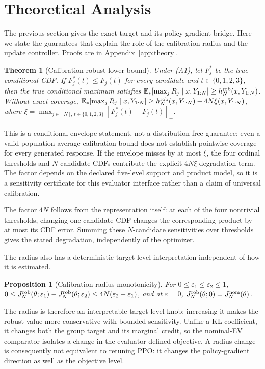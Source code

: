 \documentclass{article}
\newtheorem{proposition}{Proposition}
\newtheorem{theorem}{Theorem}
\theoremstyle{definition}
\theoremstyle{remark}
\begin{document}
\section{Theoretical Analysis}
\label{sec:theory}

The previous section gives the exact target and its policy-gradient bridge.
Here we state the guarantees that explain the role of the calibration radius
and the update controller.  Proofs are in Appendix~\ref{app:theory}.

\begin{theorem}[Calibration-robust lower bound]
\label{thm:coverage-summary}
Under (A1), let \(F_j^*\) be the true conditional CDF.  If
\(F_j^*(t)\le\overline F_j(t)\) for every candidate and
\(t\in\{0,1,2,3\}\), then
the true conditional maximum satisfies
\(\mathbb E_*[\max_jR_j\mid x,Y_{1:N}]\ge h_N^{\rm rob}(x,Y_{1:N})\).
Without exact coverage,
\(\mathbb E_*[\max_jR_j\mid x,Y_{1:N}]
\ge h_N^{\rm rob}(x,Y_{1:N})-4N\xi(x,Y_{1:N})\), where
\(\xi=\max_{j\in[N],\,t\in\{0,1,2,3\}}
[F_j^*(t)-\overline F_j(t)]_+\).
\end{theorem}

This is a conditional envelope statement, not a distribution-free guarantee:
even a valid population-average calibration bound does not establish
pointwise coverage for every generated response.  If the envelope misses by at most
\(\xi\), the four ordinal thresholds and \(N\) candidate CDFs contribute the
explicit \(4N\xi\) degradation term.  The factor depends on the declared
five-level support and product model, so it is a sensitivity certificate for
this evaluator interface rather than a claim of universal calibration.

The factor \(4N\) follows from the representation itself: at each of the four
nontrivial thresholds, changing one candidate CDF changes the corresponding
product by at most its CDF error.  Summing these \(N\)-candidate sensitivities
over thresholds gives the stated degradation, independently of the optimizer.

The radius also has a deterministic target-level interpretation independent of
how it is estimated.
\begin{proposition}[Calibration-radius monotonicity]
\label{prop:radius-monotonicity}
For \(0\le\varepsilon_1\le\varepsilon_2\le1\),
\(0\le J_N^{\rm rob}(\theta;\varepsilon_1)-J_N^{\rm rob}(\theta;\varepsilon_2)
\le4N(\varepsilon_2-\varepsilon_1)\), and at \(\varepsilon=0\),
\(J_N^{\rm rob}(\theta;0)=J_N^{\rm nom}(\theta)\).
\end{proposition}
The radius is therefore an interpretable target-level knob: increasing it makes
the robust value more conservative with bounded sensitivity.  Unlike a KL
coefficient, it changes both the group target and its marginal credit, so the
nominal-EV comparator isolates a change in the evaluator-defined objective.  A
radius change is consequently not equivalent to retuning PPO: it changes the
policy-gradient direction as well as the objective level.
\end{document}

